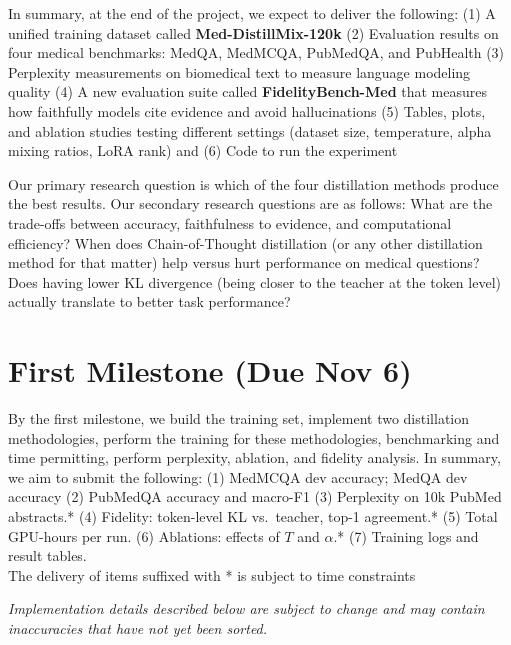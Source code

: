 \documentclass[10pt]{article}
\begin{document}
In summary, at the end of the project, we expect to deliver the following: (1) A unified training dataset called \textbf{Med-DistillMix-120k} (2) Evaluation results on four medical benchmarks: MedQA, MedMCQA, PubMedQA, and PubHealth (3) Perplexity measurements on biomedical text to measure language modeling quality (4) A new evaluation suite called \textbf{FidelityBench-Med} that measures how faithfully models cite evidence and avoid hallucinations (5) Tables, plots, and ablation studies testing different settings (dataset size, temperature, alpha mixing ratios, LoRA rank) and (6) Code to run the experiment

Our primary research question is which of the four distillation methods produce the best results. Our secondary research questions are as follows:
What are the trade-offs between accuracy, faithfulness to evidence, and computational efficiency? When does Chain-of-Thought distillation (or any other distillation method for that matter) help versus hurt performance on medical questions? Does having lower KL divergence (being closer to the teacher at the token level) actually translate to better task performance?
\\
\section*{First Milestone (Due Nov 6)}

By the first milestone, we build the training set, implement two distillation methodologies, perform the training for these methodologies, benchmarking and time permitting, perform perplexity, ablation, and fidelity analysis.
In summary, we aim to submit the following:
(1) MedMCQA dev accuracy; MedQA dev accuracy (2) PubMedQA accuracy and macro-F1 (3) Perplexity on 10k PubMed abstracts.* (4) Fidelity: token-level KL vs.\ teacher, top-1 agreement.* (5) Total GPU-hours per run. (6) Ablations: effects of $T$ and $\alpha$.* (7) Training logs and result tables.
\\
The delivery of items suffixed with * is subject to time constraints

\textit{Implementation details described below are subject to change and may contain inaccuracies that have not yet been sorted.}
\end{document}
